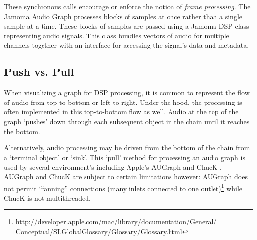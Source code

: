\documentclass[twoside,a4paper]{article}
\begin{document}
These synchronous calls encourage or enforce the notion of \emph{frame processing}.  
The Jamoma Audio Graph processes blocks of samples at once rather than a single sample at a time.  
These blocks of samples are passed using a Jamoma DSP class representing audio signals.  This class bundles vectors of audio for multiple channels together with an interface for accessing the signal's data and metadata.




\subsection{Push vs. Pull} \label{sec:pull} %

When visualizing a graph for DSP processing, it is common to represent the flow of audio from top to bottom or left to right.  
Under the hood, the processing is often implemented in this top-to-bottom flow as well.  
Audio at the top of the graph `pushes' down through each subsequent object in the chain until it reaches the bottom.

Alternatively, audio processing may be driven from the bottom of the chain from a `terminal object' or `sink'.  
This `pull' method for processing an audio graph is used by several environment's including Apple's AUGraph and ChucK \cite{wang:2008}. 
AUGraph and ChucK are subject to certain limitations however: AUGraph does not permit ``fanning'' connections (many inlets connected to one outlet)\footnote{http://developer.apple.com/mac/library/documentation/General/\\Conceptual/SLGlobalGlossary/Glossary/Glossary.html} while ChucK is not multithreaded.

\end{document}
